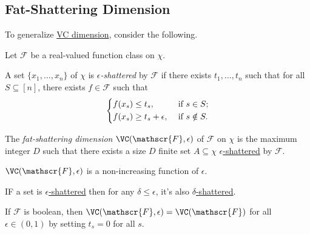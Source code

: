 \subsection{Fat-Shattering Dimension}
To generalize \hyperref[def:VC-dimension]{VC dimension}, consider the following.

\begin{definition*}
	Let \(\mathscr{F} \) be a real-valued function class on \(\chi \).
	\begin{definition}\label{def:eps-shattered}
		A set \(\{ x_1, \dots , x_n \} \) of \(\chi \) is \emph{\(\epsilon \)-shattered} by \(\mathscr{F} \) if there exists \(t_1, \dots , t_n\) such that for all \(S \subseteq [n]\), there exists \(f\in \mathscr{F} \) such that
		\[
			\begin{dcases}
				f(x_s) \leq t_s,             & \text{ if } s\in S ;   \\
				f(x_s) \geq t_s + \epsilon , & \text{ if } s\notin S.
			\end{dcases}
		\]
	\end{definition}

	\begin{definition}\label{def:fat-shattering-dimension}
		The \emph{fat-shattering dimension} \(\VC(\mathscr{F}, \epsilon)\) of \(\mathscr{F} \) on \(\chi \) is the maximum integer \(D\) such that there exists a size \(D\) finite set \(A \subseteq \chi \) \hyperref[def:eps-shattered]{\(\epsilon\)-shattered} by \(\mathscr{F} \).
	\end{definition}
\end{definition*}

\begin{remark}
	\(\VC(\mathscr{F} , \epsilon )\) is a non-increasing function of \(\epsilon \).
\end{remark}
\begin{explanation}
	IF a set is \hyperref[def:eps-shattered]{\(\epsilon\)-shattered} then for any \(\delta \leq \epsilon \), it's also \hyperref[def:eps-shattered]{\(\delta\)-shattered}.
\end{explanation}

\begin{note}
	If \(\mathscr{F} \) is boolean, then \(\VC(\mathscr{F} , \epsilon ) = \VC(\mathscr{F} )\) for all \(\epsilon \in (0, 1)\) by setting \(t_s = 0\) for all \(s\).
\end{note}

